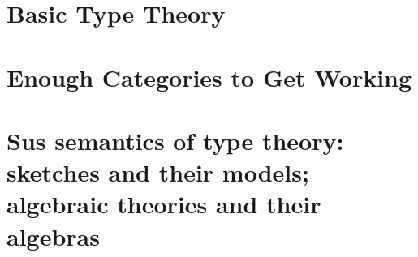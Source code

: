 \documentclass[12pt,twoside]{reedthesis}
\theoremstyle{definition}
\theoremstyle{remark}
\theoremstyle{plain}
\begin{document}
\chapter{Basic Type Theory}
\chapter{Enough Categories to Get Working}
\chapter{Sus semantics of type theory: sketches and their models; algebraic theories and their algebras}

% 


\end{document}
